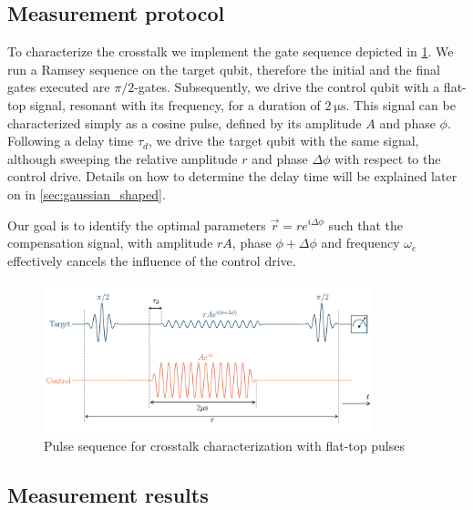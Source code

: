 \subsection{Measurement protocol}

To characterize the crosstalk we implement the gate sequence depicted in \cref{fig:pulse_train_flattop}.
We run a Ramsey sequence on the target qubit, therefore the initial and the final gates executed are $\pi/2$-gates.
Subsequently, we drive the control qubit with a flat-top signal, resonant with its frequency, for a duration of $\SI{2}{\micro \second}$.
This signal can be characterized simply as a cosine pulse, defined by its amplitude $A$ and phase $\phi$.
Following a delay time $\tau_d$, we drive the target qubit with the same signal, although sweeping the relative amplitude $r$ and phase $\Delta \phi$ with respect to the control drive. 
Details on how to determine the delay time will be explained later on in \cref{sec:gaussian_shaped}.

Our goal is to identify the optimal parameters $\Vec{r} = r e^{i\Delta \phi}$ such that the compensation signal, with amplitude $rA$, phase $\phi + \Delta \phi$ and frequency $\omega_c$ effectively cancels the influence of the control drive.

\begin{figure}
    \centering
    \includegraphics[width=0.85\textwidth]{Images//Chap2.0/diagram_falttop.pdf}
    \vspace{-0.5cm}
    \caption{Pulse sequence for crosstalk characterization with flat-top pulses}
    \label{fig:pulse_train_flattop}
\end{figure}

\subsection{Measurement results}


